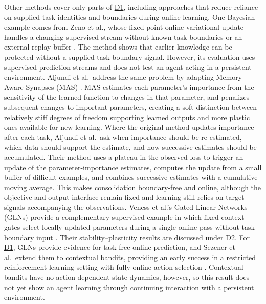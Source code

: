 \documentclass[10pt,journal,compsoc]{IEEEtran}
\DeclareRobustCommand{\Dref}[1]{\hyperref[sec:d#1]{D#1}}
\begin{document}
Other methods cover only parts of \Dref{1}, including approaches that reduce reliance on supplied task identities and boundaries during online learning.
One Bayesian example comes from Zeno et al., whose fixed-point online variational update handles a changing supervised stream without known task boundaries or an external replay buffer \cite{zeno2021}.
The method shows that earlier knowledge can be protected without a supplied task-boundary signal.
However, its evaluation uses supervised prediction streams and does not test an agent acting in a persistent environment.
Aljundi et al.\ address the same problem by adapting Memory Aware Synapses (MAS) \cite{aljundi2018,aljundi2019}.
MAS estimates each parameter's importance from the sensitivity of the learned function to changes in that parameter, and penalizes subsequent changes to important parameters, creating a soft distinction between relatively stiff degrees of freedom supporting learned outputs and more plastic ones available for new learning.
Where the original method updates importance after each task, Aljundi et al.\ ask when importance should be re-estimated, which data should support the estimate, and how successive estimates should be accumulated.
Their method uses a plateau in the observed loss to trigger an update of the parameter-importance estimates, computes the update from a small buffer of difficult examples, and combines successive estimates with a cumulative moving average.
This makes consolidation boundary-free and online, although the objective and output interface remain fixed and learning still relies on target signals accompanying the observations.
Veness et al.'s Gated Linear Networks (GLNs) provide a complementary supervised example in which fixed context gates select locally updated parameters during a single online pass without task-boundary input \cite{veness2021}.
Their stability--plasticity results are discussed under \Dref{2}.
For \Dref{1}, GLNs provide evidence for task-free online prediction, and Sezener et al.\ extend them to contextual bandits, providing an early success in a restricted reinforcement-learning setting with fully online action selection \cite{sezener2020}.
Contextual bandits have no action-dependent state dynamics, however, so this result does not yet show an agent learning through continuing interaction with a persistent environment.
\end{document}
